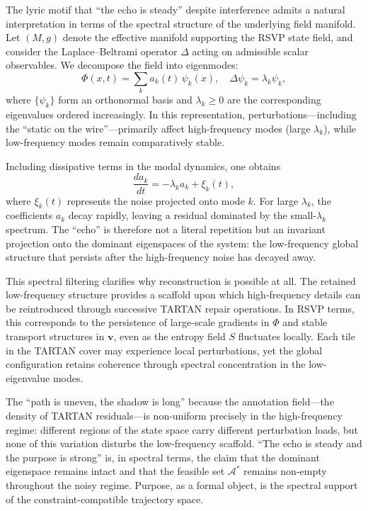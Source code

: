 \documentclass[12pt, a4paper]{article}
\begin{document}
The lyric motif that ``the echo is steady'' despite interference admits a natural interpretation in terms of the spectral structure of the underlying field manifold. Let $(M, g)$ denote the effective manifold supporting the RSVP state field, and consider the Laplace--Beltrami operator $\Delta$ acting on admissible scalar observables. We decompose the field into eigenmodes:
\[
\Phi(x,t) = \sum_{k} a_k(t)\,\psi_k(x), \quad \Delta\psi_k = \lambda_k\psi_k,
\]
where $\{\psi_k\}$ form an orthonormal basis and $\lambda_k \geq 0$ are the corresponding eigenvalues ordered increasingly. In this representation, perturbations---including the ``static on the wire''---primarily affect high-frequency modes (large $\lambda_k$), while low-frequency modes remain comparatively stable.

Including dissipative terms in the modal dynamics, one obtains
\[
\frac{da_k}{dt} = -\lambda_k a_k + \xi_k(t),
\]
where $\xi_k(t)$ represents the noise projected onto mode $k$. For large $\lambda_k$, the coefficients $a_k$ decay rapidly, leaving a residual dominated by the small-$\lambda_k$ spectrum. The ``echo'' is therefore not a literal repetition but an invariant projection onto the dominant eigenspaces of the system: the low-frequency global structure that persists after the high-frequency noise has decayed away.

This spectral filtering clarifies why reconstruction is possible at all. The retained low-frequency structure provides a scaffold upon which high-frequency details can be reintroduced through successive TARTAN repair operations. In RSVP terms, this corresponds to the persistence of large-scale gradients in $\Phi$ and stable transport structures in $\mathbf{v}$, even as the entropy field $S$ fluctuates locally. Each tile in the TARTAN cover may experience local perturbations, yet the global configuration retains coherence through spectral concentration in the low-eigenvalue modes.

The ``path is uneven, the shadow is long'' because the annotation field---the density of TARTAN residuals---is non-uniform precisely in the high-frequency regime: different regions of the state space carry different perturbation loads, but none of this variation disturbs the low-frequency scaffold. ``The echo is steady and the purpose is strong'' is, in spectral terms, the claim that the dominant eigenspace remains intact and that the feasible set $\mathcal{A}^*$ remains non-empty throughout the noisy regime. Purpose, as a formal object, is the spectral support of the constraint-compatible trajectory space.
\end{document}
